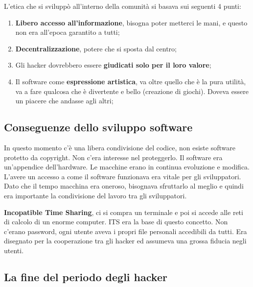 L'etica che si sviluppò all'interno della comunità si basava sui seguenti 4 punti:

\begin{enumerate}

\item \textbf{Libero accesso all'informazione}, bisogna poter metterci le mani, e questo non era all'epoca garantito a tutti;
\item \textbf{Decentralizzazione}, potere che si sposta dal centro;
\item Gli hacker dovrebbero essere \textbf{giudicati solo per il loro valore};
\item Il software come \textbf{espressione artistica}, va oltre quello che è la pura utilità, va a fare qualcosa che è divertente e bello (creazione di giochi). Doveva essere un piacere che andasse agli altri;

\end{enumerate}

\subsection{Conseguenze dello sviluppo software}

In questo momento c'è una libera condivisione del codice, non esiste software protetto da copyright. Non c'era interesse nel proteggerlo. Il software era un'appendice dell'hardware. Le macchine erano in continua evoluzione e modifica. L'avere un accesso a come il software funzionava era vitale per gli sviluppatori. Dato che il tempo macchina era oneroso, bisognava sfruttarlo al meglio e quindi era importante la condivisione del lavoro tra gli sviluppatori.

\textbf{Incopatible Time Sharing}, ci si compra un terminale e poi si accede alle reti di calcolo di un enorme computer. ITS era la base di questo concetto. Non c'erano password, ogni utente aveva i propri file personali accedibili da tutti. Era disegnato per la cooperazione tra gli hacker ed assumeva una grossa fiducia negli utenti.

\subsection{La fine del periodo degli hacker}

